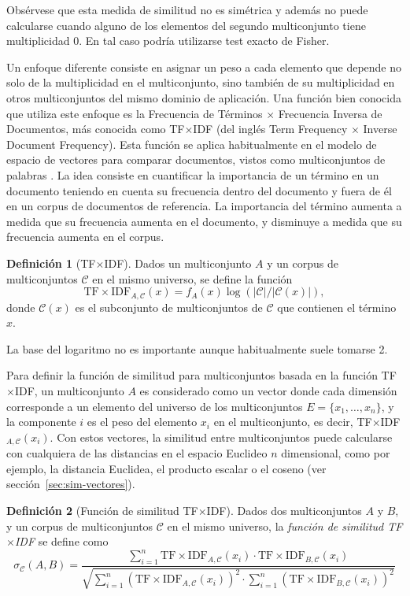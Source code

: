 \documentclass[a4paper,10pt,twoside]{article}
\theoremstyle{definition}
\newtheorem{definition}{Definición}
\begin{document}
Obsérvese que esta medida de similitud no es simétrica y además no puede calcularse cuando alguno de los elementos del segundo multiconjunto tiene multiplicidad 0.
En tal caso podría utilizarse test exacto de Fisher. 

Un enfoque diferente consiste en asignar un peso a cada elemento que depende no solo de la multiplicidad en el multiconjunto, sino también de su multiplicidad en otros multiconjuntos del mismo dominio de aplicación.
Una función bien conocida que utiliza este enfoque es la Frecuencia de Términos $\times$ Frecuencia Inversa de
Documentos, más conocida como TF$\times$IDF (del inglés Term Frequency $\times$ Inverse Document Frequency).
Esta función se aplica habitualmente en el modelo de espacio de vectores para comparar documentos, vistos como multiconjuntos de palabras \cite{salton1975vector}. 
La idea consiste en cuantificar la importancia de un término en un documento teniendo en cuenta su frecuencia dentro del documento y fuera de él en un corpus de documentos de referencia. 
La importancia del término aumenta a medida que su frecuencia aumenta en el documento, y disminuye a medida que su frecuencia aumenta en el corpus. 

\begin{definition}[TF$\times$IDF]
Dados un multiconjunto $A$ y un corpus de multiconjuntos $\mathcal{C}$ en el mismo universo, se define la función
\[
\textrm{TF}\times\textrm{IDF}_{A,\mathcal{C}}(x)=f_A(x)\log(|\mathcal{C}|/|\mathcal{C}(x)|),
\]
donde $\mathcal{C}(x)$ es el subconjunto de multiconjuntos de $\mathcal{C}$ que contienen el término $x$.
\end{definition}

La base del logaritmo no es importante aunque habitualmente suele tomarse 2.

Para definir la función de similitud para multiconjuntos basada en la función TF$\times$IDF, un multiconjunto $A$ es considerado como un vector donde cada dimensión corresponde a un elemento del universo de los multiconjuntos $E=\{x_1,\ldots,x_n\}$, y la
componente $i$ es el peso del elemento $x_i$ en el multiconjunto, es decir, TF$\times$IDF$_{A,\mathcal{C}}(x_i)$.
Con estos vectores, la similitud entre multiconjuntos puede calcularse con cualquiera de las distancias en el espacio Euclideo $n$ dimensional, como por ejemplo, la distancia Euclidea, el producto escalar o el coseno (ver
sección~\ref{sec:sim-vectores}).

\begin{definition}[Función de similitud TF$\times$IDF]
Dados dos multiconjuntos $A$ y $B$, y un corpus de multiconjuntos $\mathcal{C}$ en el mismo universo, la \emph{función de
similitud TF$\times$IDF} se define como
\[
\sigma_{\mathcal{C}}(A,B)=
\frac{\sum_{i=1}^{n}\textrm{TF}\times\textrm{IDF}_{A,\mathcal{C}}(x_i)\cdot \textrm{TF}\times\textrm{IDF}_{B,\mathcal{C}}(x_i)}
{\sqrt{\sum_{i=1}^n (\textrm{TF}\times\textrm{IDF}_{A,\mathcal{C}}(x_i))^2 \cdot \sum_{i=1}^n (\textrm{TF}\times\textrm{IDF}_{B,\mathcal{C}}(x_i))^2}}
\]
\end{definition}
\end{document}
